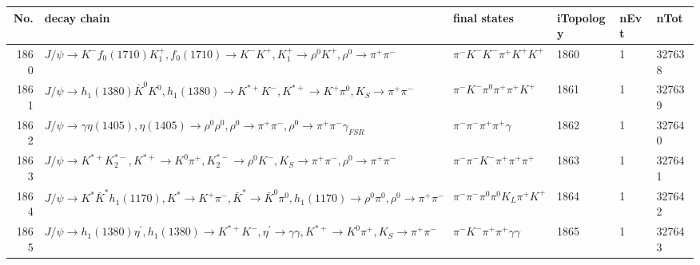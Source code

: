 \begin{table}[htbp] 
\begin{center}
\begin{small}
\begin{tabular}{rlllll}\hline\hline
 No. & decay chain & final states &  iTopology & nEvt & nTot \\\hline
1860&$J/\psi       \rightarrow K^{-}          f_{0}(1710)    K_1^{+}        , f_{0}(1710)     \rightarrow K^{-}          K^{+}          , K_1^{+}         \rightarrow \rho^{0}      K^{+}          , \rho^{0}       \rightarrow \pi^{+}        \pi^{-}        $&$\pi^{-}        K^{-}          K^{-}          \pi^{+}        K^{+}          K^{+}          $& 1860&    1&327638\\
1861&$J/\psi       \rightarrow h_{1}(1380)    \bar{K}^{0}   K^{0}          , h_{1}(1380)     \rightarrow K^{*+}         K^{-}          , K^{*+}          \rightarrow K^{+}          \pi^{0}        , K_{S}           \rightarrow \pi^{+}        \pi^{-}        $&$\pi^{-}        K^{-}          \pi^{0}        \pi^{+}        \pi^{+}        K^{+}          $& 1861&    1&327639\\
1862&$J/\psi       \rightarrow \gamma       \eta(1405)    , \eta(1405)     \rightarrow \rho^{0}      \rho^{0}      , \rho^{0}       \rightarrow \pi^{+}        \pi^{-}        , \rho^{0}       \rightarrow \pi^{+}        \pi^{-}        \gamma_{FSR} $&$\pi^{-}        \pi^{-}        \pi^{+}        \pi^{+}        \gamma       $& 1862&    1&327640\\
1863&$J/\psi       \rightarrow K^{*+}         K_2^{*-}       , K^{*+}          \rightarrow K^{0}          \pi^{+}        , K_2^{*-}        \rightarrow \rho^{0}      K^{-}          , K_{S}           \rightarrow \pi^{+}        \pi^{-}        , \rho^{0}       \rightarrow \pi^{+}        \pi^{-}        $&$\pi^{-}        \pi^{-}        K^{-}          \pi^{+}        \pi^{+}        \pi^{+}        $& 1863&    1&327641\\
1864&$J/\psi       \rightarrow K^{*}          \bar{K}^{*}   h_{1}(1170)    , K^{*}           \rightarrow K^{+}          \pi^{-}        , \bar{K}^{*}    \rightarrow \bar{K}^{0}   \pi^{0}        , h_{1}(1170)     \rightarrow \rho^{0}      \pi^{0}        , \rho^{0}       \rightarrow \pi^{+}        \pi^{-}        $&$\pi^{-}        \pi^{-}        \pi^{0}        \pi^{0}        K_{L}          \pi^{+}        K^{+}          $& 1864&    1&327642\\
1865&$J/\psi       \rightarrow h_{1}(1380)    \eta^{\prime} , h_{1}(1380)     \rightarrow K^{*+}         K^{-}          , \eta^{\prime}  \rightarrow \gamma       \gamma       , K^{*+}          \rightarrow K^{0}          \pi^{+}        , K_{S}           \rightarrow \pi^{+}        \pi^{-}        $&$\pi^{-}        K^{-}          \pi^{+}        \pi^{+}        \gamma       \gamma       $& 1865&    1&327643\\

\end{tabular}
\end{small}
\end{center}
\end{table}
